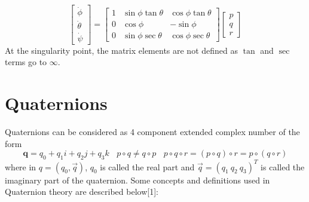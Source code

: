 \documentclass{article}
\begin{document}
\begin{equation}
		\begin{bmatrix}
		\dot{\phi}\\\dot{\theta} \\ \dot{\psi}
		\end{bmatrix} = \begin{bmatrix}
		1 & \sin\phi\tan\theta & \cos\phi\tan\theta \\
		0 & \cos\phi & -\sin\phi \\
		0 & \sin\phi\sec\theta & \cos\phi\sec\theta
		\end{bmatrix}\begin{bmatrix}
		p\\q\\r \end{bmatrix}
\end{equation}
At the singularity point, the matrix elements are not defined as $\tan$ and $\sec$ terms go to $\infty$.

\section{Quaternions}

Quaternions can be considered as 4 component extended complex number of the form 
\begin{equation}
\textbf{q} = q_0 + q_1i + q_2j + q_3k  ~~~~  p\circ q \neq q\circ p ~~~~     p\circ q\circ r = (p\circ q)\circ r = p\circ (q\circ r)
\end{equation}
where in $q=(q_0,\vec{q})$, $q_0$ is called the real part and $\vec{q}=(q_1~q_2~q_3)^T$ is called the imaginary part of the quaternion. Some concepts and definitions used in Quaternion theory are described below[1]:
\end{document}
